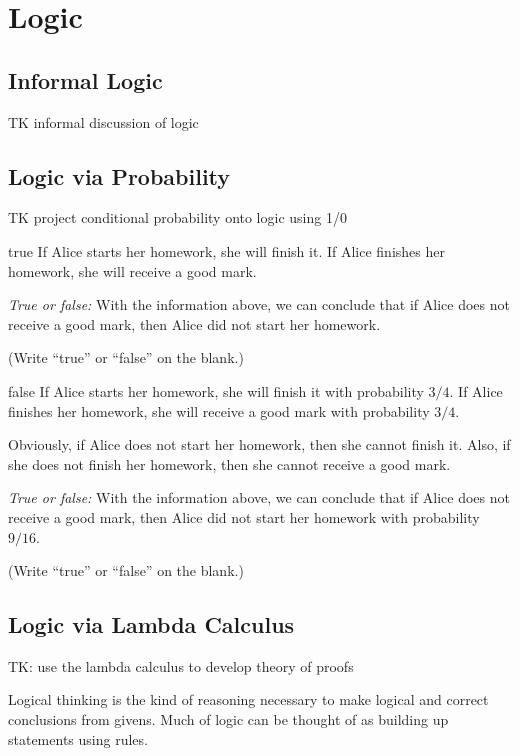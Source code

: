 \documentclass[a4paper,10pt]{report}
\begin{document}
\chapter{Logic}

\section{Informal Logic}

TK informal discussion of logic

\section{Logic via Probability}

TK project conditional probability onto logic using 1/0

\begin{problem}{true}
  If Alice starts her homework, she will finish it. If Alice finishes her homework, she will
  receive a good mark.

  \textit{True or false:}
  With the information above, we can conclude that if Alice does not receive a good mark,
  then Alice did not start her homework.

  (Write ``true'' or ``false'' on the blank.)
\end{problem}

\begin{problem}{false}
  If Alice starts her homework, she will finish it with probability \(3/4\). If Alice
  finishes her homework, she will receive a good mark with probability \(3/4\).

  Obviously, if Alice does not start her homework, then she cannot finish it. Also, if she
  does not finish her homework, then she cannot receive a good mark.

  \textit{True or false:}
  With the information above, we can conclude that if Alice does not receive a good mark,
  then Alice did not start her homework with probability \(9/16\).

  (Write ``true'' or ``false'' on the blank.)
\end{problem}

\section{Logic via Lambda Calculus}

TK: use the lambda calculus to develop theory of proofs

Logical thinking is the kind of reasoning necessary to make logical and correct
conclusions from givens. Much of logic can be thought of as building up
statements using rules.
\end{document}
